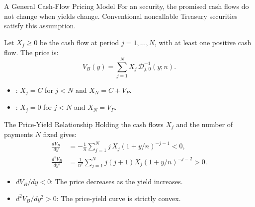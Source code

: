 \documentclass[aspectratio=169,11pt]{beamer}
\begin{document}
\begin{frame}{A General Cash-Flow Pricing Model}
  \vspace{0.2em}
  For an  security, the promised cash flows do not change
  when yields change. Conventional noncallable Treasury securities satisfy this
  assumption.

  \vspace{0.5em}
  Let $X_j\ge0$ be the cash flow at period $j=1,\ldots,N$, with at least one
  positive cash flow. The price is:
  \[
    V_B(y)=\sum_{j=1}^{N}X_j\,\mathcal D_{j,0}^{-1}(y;n).
  \]

  \vspace{0.3em}
  \begin{itemize}\setlength{\itemsep}{0.3em}
    \item {}: $X_j=C$ for $j<N$ and $X_N=C+V_P$.
    \item {}: $X_j=0$ for $j<N$ and $X_N=V_P$.
  \end{itemize}

\end{frame}

\begin{frame}{The Price-Yield Relationship}
  \vspace{0.3em}
  Holding the cash flows $X_j$ and the number of payments $N$ fixed gives:
  \[
    \begin{aligned}
      \frac{dV_B}{dy}&=-\frac{1}{n}\sum_{j=1}^{N}j\,X_j\left(1+y/n\right)^{-j-1}<0,\\[0.2em]
      \frac{d^2V_B}{dy^2}&=\frac{1}{n^2}\sum_{j=1}^{N}j(j+1)X_j\left(1+y/n\right)^{-j-2}>0 .
    \end{aligned}
  \]

  \vspace{0.4em}
  \begin{itemize}\setlength{\itemsep}{0.35em}
    \item $dV_B/dy<0$: The price decreases as the yield increases.
    \item $d^2V_B/dy^2>0$: The price-yield curve is strictly convex.
  \end{itemize}

\end{frame}
\end{document}
